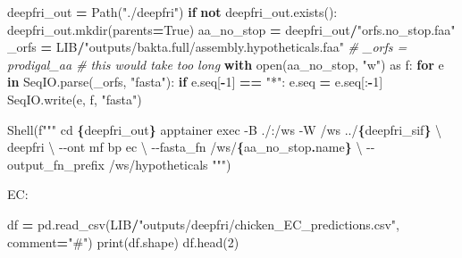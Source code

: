\documentclass[
]{book}
\newenvironment{Shaded}{\begin{snugshade}}{\end{snugshade}}
\newcommand{\BuiltInTok}[1]{#1}
\newcommand{\CharTok}[1]{\textcolor[rgb]{0.31,0.60,0.02}{#1}}
\newcommand{\CommentTok}[1]{\textcolor[rgb]{0.56,0.35,0.01}{\textit{#1}}}
\newcommand{\ControlFlowTok}[1]{\textcolor[rgb]{0.13,0.29,0.53}{\textbf{#1}}}
\newcommand{\DecValTok}[1]{\textcolor[rgb]{0.00,0.00,0.81}{#1}}
\newcommand{\ImportTok}[1]{#1}
\newcommand{\KeywordTok}[1]{\textcolor[rgb]{0.13,0.29,0.53}{\textbf{#1}}}
\newcommand{\NormalTok}[1]{#1}
\newcommand{\OperatorTok}[1]{\textcolor[rgb]{0.81,0.36,0.00}{\textbf{#1}}}
\newcommand{\SpecialCharTok}[1]{\textcolor[rgb]{0.81,0.36,0.00}{\textbf{#1}}}
\newcommand{\SpecialStringTok}[1]{\textcolor[rgb]{0.31,0.60,0.02}{#1}}
\newcommand{\StringTok}[1]{\textcolor[rgb]{0.31,0.60,0.02}{#1}}
\newcommand{\VariableTok}[1]{\textcolor[rgb]{0.00,0.00,0.00}{#1}}
\begin{document}
\begin{Shaded}
\begin{Highlighting}[numbers=left,,]
\NormalTok{deepfri\_out }\OperatorTok{=}\NormalTok{ Path(}\StringTok{"./deepfri"}\NormalTok{)}
\ControlFlowTok{if} \KeywordTok{not}\NormalTok{ deepfri\_out.exists():}
\NormalTok{    deepfri\_out.mkdir(parents}\OperatorTok{=}\VariableTok{True}\NormalTok{)}
\NormalTok{aa\_no\_stop }\OperatorTok{=}\NormalTok{ deepfri\_out}\OperatorTok{/}\StringTok{"orfs.no\_stop.faa"}
\NormalTok{\_orfs }\OperatorTok{=}\NormalTok{ LIB}\OperatorTok{/}\StringTok{"outputs/bakta.full/assembly.hypotheticals.faa"}
\CommentTok{\# \_orfs = prodigal\_aa \# this would take too long}
\ControlFlowTok{with} \BuiltInTok{open}\NormalTok{(aa\_no\_stop, }\StringTok{"w"}\NormalTok{) }\ImportTok{as}\NormalTok{ f:}
    \ControlFlowTok{for}\NormalTok{ e }\KeywordTok{in}\NormalTok{ SeqIO.parse(\_orfs, }\StringTok{"fasta"}\NormalTok{):}
        \ControlFlowTok{if}\NormalTok{ e.seq[}\OperatorTok{{-}}\DecValTok{1}\NormalTok{] }\OperatorTok{==} \StringTok{"*"}\NormalTok{:}
\NormalTok{            e.seq }\OperatorTok{=}\NormalTok{ e.seq[:}\OperatorTok{{-}}\DecValTok{1}\NormalTok{]}
\NormalTok{        SeqIO.write(e, f, }\StringTok{"fasta"}\NormalTok{)}
\end{Highlighting}
\end{Shaded}

\begin{Shaded}
\begin{Highlighting}[numbers=left,,]
\NormalTok{Shell(}\SpecialStringTok{f"""}
\SpecialStringTok{cd }\SpecialCharTok{\{}\NormalTok{deepfri\_out}\SpecialCharTok{\}}
\SpecialStringTok{apptainer exec {-}B ./:/ws {-}W /ws ../}\SpecialCharTok{\{}\NormalTok{deepfri\_sif}\SpecialCharTok{\}}\SpecialStringTok{ }\CharTok{\textbackslash{}}
\SpecialStringTok{    deepfri }\CharTok{\textbackslash{}}
\SpecialStringTok{        {-}{-}ont mf bp ec }\CharTok{\textbackslash{}}
\SpecialStringTok{        {-}{-}fasta\_fn /ws/}\SpecialCharTok{\{}\NormalTok{aa\_no\_stop}\SpecialCharTok{.}\NormalTok{name}\SpecialCharTok{\}}\SpecialStringTok{ }\CharTok{\textbackslash{}}
\SpecialStringTok{        {-}{-}output\_fn\_prefix /ws/hypotheticals}
\SpecialStringTok{"""}\NormalTok{)}
\end{Highlighting}
\end{Shaded}

EC:

\begin{Shaded}
\begin{Highlighting}[numbers=left,,]
\NormalTok{df }\OperatorTok{=}\NormalTok{ pd.read\_csv(LIB}\OperatorTok{/}\StringTok{"outputs/deepfri/chicken\_EC\_predictions.csv"}\NormalTok{, comment}\OperatorTok{=}\StringTok{"\#"}\NormalTok{)}
\BuiltInTok{print}\NormalTok{(df.shape)}
\NormalTok{df.head(}\DecValTok{2}\NormalTok{)}
\end{Highlighting}
\end{Shaded}
\end{document}
